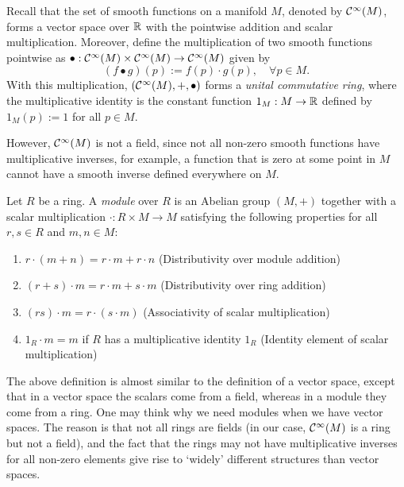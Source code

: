 \begin{remark}
	Recall that the set of smooth functions on a manifold \(M\), denoted by \(\mathcal C^\infty(M)\), forms a vector space over \(\mathbb R\) with the pointwise addition and scalar multiplication. Moreover, define the multiplication of two smooth functions pointwise as \(\bullet: \mathcal C^\infty(M) \times \mathcal C^\infty(M) \to \mathcal C^\infty(M)\) given by
	\begin{equation*}
		(f \bullet g)(p) := f(p) \cdot g(p), \quad \forall p \in M.
	\end{equation*}
	With this multiplication, \((\mathcal C^\infty(M), +, \bullet)\) forms a \textit{unital commutative ring}, where the multiplicative identity is the constant function \(1_M: M \to \mathbb R\) defined by \(1_M(p) := 1\) for all \(p \in M\).

	However, \(\mathcal C^\infty(M)\) is not a field, since not all non-zero smooth functions have multiplicative inverses, for example, a function that is zero at some point in \(M\) cannot have a smooth inverse defined everywhere on \(M\).
\end{remark}
\begin{definition}[Module]
	Let \(R\) be a ring. A \emph{module} over \(R\) is an Abelian group \((M, +)\) together with a scalar multiplication \(\cdot: R \times M \to M\) satisfying the following properties for all \(r, s \in R\) and \(m, n \in M\):
	\begin{enumerate}
		\item \(r \cdot (m + n) = r \cdot m + r \cdot n\) (Distributivity over module addition)
		\item \((r + s) \cdot m = r \cdot m + s \cdot m\) (Distributivity over ring addition)
		\item \((r s) \cdot m = r \cdot (s \cdot m)\) (Associativity of scalar multiplication)
		\item \(1_R \cdot m = m\) if \(R\) has a multiplicative identity \(1_R\) (Identity element of scalar multiplication)
	\end{enumerate}
\end{definition}
The above definition is almost similar to the definition of a vector space, except that in a vector space the scalars come from a field, whereas in a module they come from a ring. One may think why we need modules when we have vector spaces. The reason is that not all rings are fields (in our case, \(\mathcal C^\infty(M)\) is a ring but not a field), and the fact that the rings may not have multiplicative inverses for all non-zero elements give rise to `widely' different structures than vector spaces.
